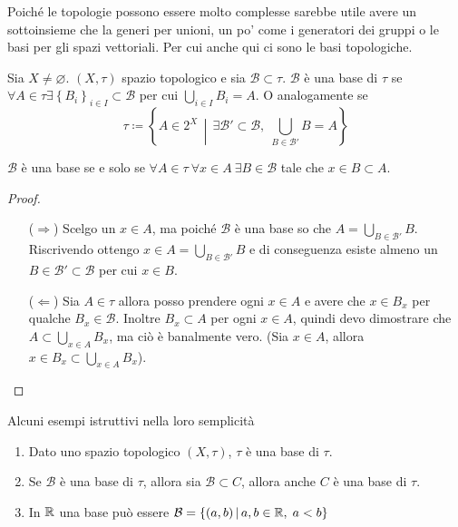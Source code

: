 Poiché le topologie possono essere molto complesse sarebbe utile avere un sottoinsieme che la generi per unioni, un po' come i generatori dei gruppi o le basi per gli spazi vettoriali. Per cui anche qui ci sono le basi topologiche.

\begin{definition}
	Sia $X \neq \varnothing$. $(X, \tau)$ spazio topologico e sia $\mathcal{B} \subset \tau$.  $\mathcal{B}$ è una base di $\tau$ se $\forall A \in \tau \exists \left\{B_i\right\}_{i \in I} \subset \mathcal{B}$ per cui $\bigcup_{i \in I} B_i = A$. O analogamente se
	\begin{equation*}	
		\tau \coloneqq \left\{A \in 2^X \,\middle|\, \exists \mathcal{B}' \subset \mathcal{B} , \; \bigcup_{B \in \mathcal{B}'} B = A \right\}
	\end{equation*}
\end{definition}

\begin{proposition}
	$\mathcal{B}$ è una base se e solo se $\forall A \in \tau\ \forall x \in A\ \exists B \in \mathcal{B}$ tale che $x \in B \subset A$.
\end{proposition}
\begin{proof}
	\begin{enumerate}
		\item[($\Rightarrow$)] Scelgo un $x \in A$, ma poiché $\mathcal{B}$ è una base so che $A = \bigcup_{B \in \mathcal{B}'} B$. Riscrivendo ottengo $x \in A = \bigcup_{B \in \mathcal{B}'} B$ e di conseguenza esiste almeno un $B \in \mathcal{B}' \subset \mathcal{B}$ per cui $x \in B$.
		\item[($\Leftarrow$)]  Sia $A \in \tau$ allora posso prendere ogni $x \in A$ e avere che $x \in B_x$ per qualche $B_x \in \mathcal{B}$. Inoltre $B_x \subset A$ per ogni $x \in A$, quindi devo dimostrare che $A \subset \bigcup_{x \in A} B_x$, ma ciò è banalmente vero. (Sia $x \in A$, allora $x \in B_x \subset \bigcup_{x \in A} B_x$).
	\end{enumerate}
\end{proof}

\begin{example}
	Alcuni esempi istruttivi nella loro semplicità
	\begin{enumerate}
		\item Dato uno spazio topologico $(X,\tau)$, $\tau$ è una base di $\tau$. 
		\item Se $\mathcal{B}$ è una base di $\tau$, allora sia $\mathcal{B} \subset C$, allora anche $C$ è una base di $\tau$.
		\item In $\mathbb{R}$ una base può essere $\mathcal{B} = \left\{(a,b) \,\middle|\, a,b \in \mathbb{R}, \; a < b \right\}$
	\end{enumerate}
\end{example}

